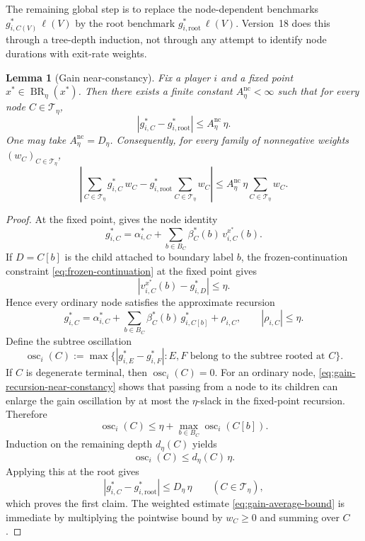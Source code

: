 \documentclass[12pt]{article}
\newtheorem{lemma}[theorem]{Lemma}
\theoremstyle{definition}
\newcommand{\1}{\mathbf{1}}
\newcommand{\cT}{\mathcal{T}}
\DeclareMathOperator{\BR}{BR}
\begin{document}
The remaining global step is to replace the node-dependent benchmarks
$g_{i,C(V)}^*\,\ell(V)$ by the root benchmark
$g_{i,\mathrm{root}}^*\,\ell(V)$. Version~18 does this through a tree-depth
induction, not through any attempt to identify node durations with exit-rate
weights.

\begin{lemma}[Gain near-constancy]
\label{lem:gain-near-constancy}
Fix a player $i$ and a fixed point $x^*\in\BR_\eta(x^*)$. Then there exists a
finite constant $A_\eta^{\mathrm{nc}}<\infty$ such that for every node
$C\in\cT_\eta$,
\[
|g_{i,C}^*-g_{i,\mathrm{root}}^*|
\le
A_\eta^{\mathrm{nc}}\,\eta.
\]
One may take $A_\eta^{\mathrm{nc}}=D_\eta$. Consequently, for every family of
nonnegative weights $(w_C)_{C\in\cT_\eta}$,
\begin{equation}
\label{eq:gain-average-bound}
\left|
\sum_{C\in\cT_\eta} g_{i,C}^*\,w_C
-
g_{i,\mathrm{root}}^*\sum_{C\in\cT_\eta} w_C
\right|
\le
A_\eta^{\mathrm{nc}}\,\eta\sum_{C\in\cT_\eta} w_C.
\end{equation}
\end{lemma}

\begin{proof}
At the fixed point,  gives the node identity
\[
g_{i,C}^*
=
\alpha_{i,C}^*
+
\sum_{b\in B_C}\beta_C^*(b)\,v_{i,C}^{x^*}(b).
\]
If $D=C[b]$ is the child attached to boundary label $b$, the frozen-continuation
constraint \eqref{eq:frozen-continuation} at the fixed point gives
\[
|v_{i,C}^{x^*}(b)-g_{i,D}^*|\le \eta.
\]
Hence every ordinary node satisfies the approximate recursion
\begin{equation}
\label{eq:gain-recursion-near-constancy}
g_{i,C}^*
=
\alpha_{i,C}^*
+
\sum_{b\in B_C}\beta_C^*(b)\,g_{i,C[b]}^*
+
\rho_{i,C},
\qquad
|\rho_{i,C}|\le \eta.
\end{equation}
Define the subtree oscillation
\[
\operatorname{osc}_i(C)
:=
\max\{|g_{i,E}^*-g_{i,F}^*|: E,F \text{ belong to the subtree rooted at } C\}.
\]
If $C$ is degenerate terminal, then $\operatorname{osc}_i(C)=0$. For an ordinary
node, \eqref{eq:gain-recursion-near-constancy} shows that passing from a node to
its children can enlarge the gain oscillation by at most the $\eta$-slack in the
fixed-point recursion. Therefore
\[
\operatorname{osc}_i(C)
\le
\eta+\max_{b\in B_C}\operatorname{osc}_i(C[b]).
\]
Induction on the remaining depth $d_\eta(C)$ yields
\[
\operatorname{osc}_i(C)\le d_\eta(C)\,\eta.
\]
Applying this at the root gives
\[
|g_{i,C}^*-g_{i,\mathrm{root}}^*|
\le
D_\eta\,\eta
\qquad (C\in\cT_\eta),
\]
which proves the first claim. The weighted estimate
\eqref{eq:gain-average-bound} is immediate by multiplying the pointwise bound by
$w_C\ge 0$ and summing over $C$.
\end{proof}
\end{document}
